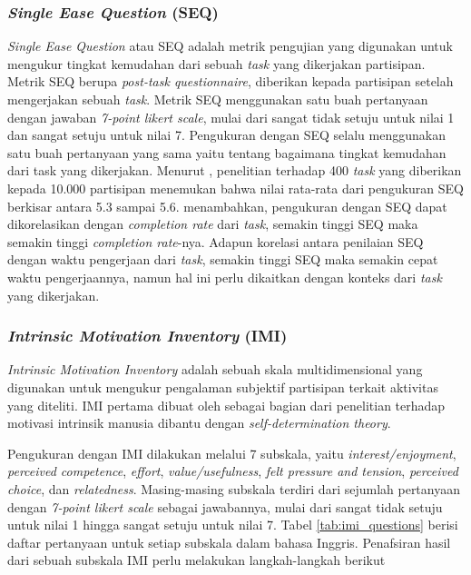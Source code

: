 \subsubsection{\textit{Single Ease Question} (SEQ)}
\label{subsubsec:seq}
\textit{Single Ease Question} atau SEQ adalah metrik pengujian yang digunakan untuk mengukur tingkat kemudahan dari sebuah \textit{task} yang dikerjakan partisipan. Metrik SEQ berupa \textit{post-task questionnaire}, diberikan kepada partisipan setelah mengerjakan sebuah \textit{task}. Metrik SEQ menggunakan satu buah pertanyaan dengan jawaban \textit{7-point likert scale}, mulai dari sangat tidak setuju untuk nilai 1 dan sangat setuju untuk nilai 7. Pengukuran dengan SEQ selalu menggunakan satu buah pertanyaan yang sama yaitu tentang bagaimana tingkat kemudahan dari task yang dikerjakan. Menurut \textcite{seq2012sauro}, penelitian terhadap 400 \textit{task} yang diberikan kepada 10.000 partisipan menemukan bahwa nilai rata-rata dari pengukuran SEQ berkisar antara 5.3 sampai 5.6. \textcite{seq2018sauro} menambahkan, pengukuran dengan SEQ dapat dikorelasikan dengan \textit{completion rate} dari \textit{task}, semakin tinggi SEQ maka semakin tinggi \textit{completion rate}-nya. Adapun korelasi antara penilaian SEQ dengan waktu pengerjaan dari \textit{task}, semakin tinggi SEQ maka semakin cepat waktu pengerjaannya, namun hal ini perlu dikaitkan dengan konteks dari \textit{task} yang dikerjakan.

\subsubsection{\textit{Intrinsic Motivation Inventory} (IMI)}
\label{subsubsec:imi}
\textit{Intrinsic Motivation Inventory} adalah sebuah skala multidimensional yang digunakan untuk mengukur pengalaman subjektif partisipan terkait aktivitas yang diteliti. \parencite{imisdtorg} IMI pertama dibuat oleh \textcite{RYANDECI2000SDT} sebagai bagian dari penelitian terhadap motivasi intrinsik manusia dibantu dengan \textit{self-determination theory}.

Pengukuran dengan IMI dilakukan melalui 7 subskala, yaitu \textit{interest/enjoyment}, \textit{perceived competence}, \textit{effort}, \textit{value/usefulness}, \textit{felt pressure and tension}, \textit{perceived choice}, dan \textit{relatedness}. Masing-masing subskala terdiri dari sejumlah pertanyaan dengan \textit{7-point likert scale} sebagai jawabannya, mulai dari sangat tidak setuju untuk nilai 1 hingga sangat setuju untuk nilai 7. Tabel \ref{tab:imi_questions} berisi daftar pertanyaan untuk setiap subskala dalam bahasa Inggris. Penafsiran hasil dari sebuah subskala IMI perlu melakukan langkah-langkah berikut

